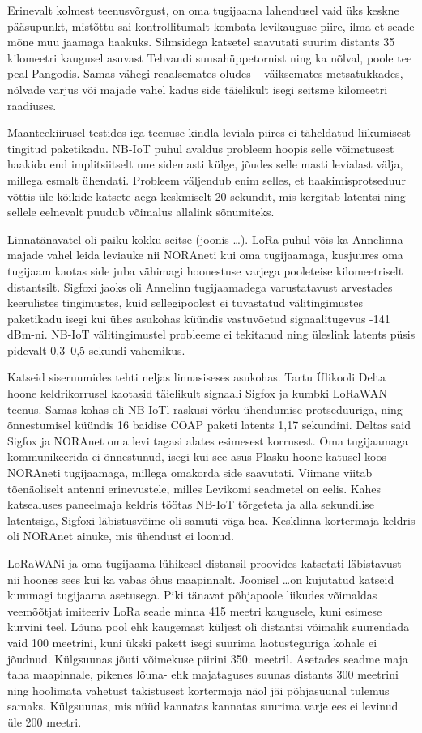 \documentclass[12pt]{article}
\begin{document}
Erinevalt kolmest teenusvõrgust, on oma tugijaama lahendusel vaid üks keskne pääsupunkt, mistõttu sai kontrollitumalt kombata levikauguse piire, ilma et seade mõne muu jaamaga haakuks.
Silmsidega katsetel saavutati suurim distants 35 kilomeetri kaugusel asuvast Tehvandi suusahüppetornist ning ka nõlval, poole tee peal Pangodis.
Samas vähegi reaalsemates oludes -- väiksemates metsatukkades, nõlvade varjus või majade vahel kadus side täielikult isegi seitsme kilomeetri raadiuses.

Maanteekiirusel testides iga teenuse kindla leviala piires ei täheldatud liikumisest tingitud paketikadu.
NB-IoT puhul avaldus probleem hoopis selle võimetusest haakida end implitsiitselt uue sidemasti külge, jõudes selle masti levialast välja, millega esmalt ühendati.
Probleem väljendub enim selles, et haakimisprotseduur võttis üle kõikide katsete aega keskmiselt 20 sekundit, mis kergitab latentsi ning sellele eelnevalt puudub võimalus allalink sõnumiteks.

Linnatänavatel oli paiku kokku seitse (joonis \ldots).
LoRa puhul võis ka Annelinna majade vahel leida leviauke nii NORAneti kui oma tugijaamaga, kusjuures oma tugijaam kaotas side juba vähimagi hoonestuse varjega pooleteise kilomeetriselt distantsilt.
Sigfoxi jaoks oli Annelinn tugijaamadega varustatavust arvestades keerulistes tingimustes, kuid sellegipoolest ei tuvastatud välitingimustes paketikadu isegi kui ühes asukohas küündis vastuvõetud signaalitugevus -141 dBm-ni.
NB-IoT välitingimustel probleeme ei tekitanud ning üleslink latents püsis pidevalt 0,3--0,5 sekundi vahemikus.

Katseid siseruumides tehti neljas linnasiseses asukohas.
Tartu Ülikooli Delta hoone keldrikorrusel kaotasid täielikult signaali Sigfox ja kumbki LoRaWAN teenus.
Samas kohas oli NB-IoTl raskusi võrku ühendumise protseduuriga, ning õnnestumisel küündis 16 baidise COAP paketi latents 1,17 sekundini.
Deltas said Sigfox ja NORAnet oma levi tagasi alates esimesest korrusest.
Oma tugijaamaga kommunikeerida ei õnnestunud, isegi kui see asus Plasku hoone katusel koos NORAneti tugijaamaga, millega omakorda side saavutati.
Viimane viitab tõenäoliselt antenni erinevustele, milles Levikomi seadmetel on eelis.
Kahes katsealuses paneelmaja keldris töötas NB-IoT tõrgeteta ja alla sekundilise latentsiga, Sigfoxi läbistusvõime oli samuti väga hea.
Kesklinna kortermaja keldris oli NORAnet ainuke, mis ühendust ei loonud.

LoRaWANi ja oma tugijaama lühikesel distansil proovides katsetati läbistavust nii hoones sees kui ka vabas õhus maapinnalt.
Joonisel \ldots on kujutatud katseid kummagi tugijaama asetusega.
Piki tänavat põhjapoole liikudes võimaldas veemõõtjat imiteeriv LoRa seade minna 415 meetri kaugusele, kuni esimese kurvini teel.
Lõuna pool ehk kaugemast küljest oli distantsi võimalik suurendada vaid 100 meetrini, kuni ükski pakett isegi suurima laotusteguriga kohale ei jõudnud.
Külgsuunas jõuti võimekuse piirini 350. meetril.
Asetades seadme maja taha maapinnale, pikenes lõuna- ehk majataguses suunas distants 300 meetrini ning hoolimata vahetust takistusest kortermaja näol jäi põhjasuunal tulemus samaks.
Külgsuunas, mis nüüd kannatas kannatas suurima varje ees ei levinud üle 200 meetri.
\end{document}
